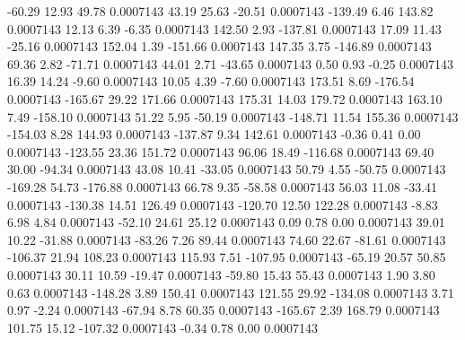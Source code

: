       -60.29       12.93       49.78     0.0007143
       43.19       25.63      -20.51     0.0007143
     -139.49        6.46      143.82     0.0007143
       12.13        6.39       -6.35     0.0007143
      142.50        2.93     -137.81     0.0007143
       17.09       11.43      -25.16     0.0007143
      152.04        1.39     -151.66     0.0007143
      147.35        3.75     -146.89     0.0007143
       69.36        2.82      -71.71     0.0007143
       44.01        2.71      -43.65     0.0007143
        0.50        0.93       -0.25     0.0007143
       16.39       14.24       -9.60     0.0007143
       10.05        4.39       -7.60     0.0007143
      173.51        8.69     -176.54     0.0007143
     -165.67       29.22      171.66     0.0007143
      175.31       14.03      179.72     0.0007143
      163.10        7.49     -158.10     0.0007143
       51.22        5.95      -50.19     0.0007143
     -148.71       11.54      155.36     0.0007143
     -154.03        8.28      144.93     0.0007143
     -137.87        9.34      142.61     0.0007143
       -0.36        0.41        0.00     0.0007143
     -123.55       23.36      151.72     0.0007143
       96.06       18.49     -116.68     0.0007143
       69.40       30.00      -94.34     0.0007143
       43.08       10.41      -33.05     0.0007143
       50.79        4.55      -50.75     0.0007143
     -169.28       54.73     -176.88     0.0007143
       66.78        9.35      -58.58     0.0007143
       56.03       11.08      -33.41     0.0007143
     -130.38       14.51      126.49     0.0007143
     -120.70       12.50      122.28     0.0007143
       -8.83        6.98        4.84     0.0007143
      -52.10       24.61       25.12     0.0007143
        0.09        0.78        0.00     0.0007143
       39.01       10.22      -31.88     0.0007143
      -83.26        7.26       89.44     0.0007143
       74.60       22.67      -81.61     0.0007143
     -106.37       21.94      108.23     0.0007143
      115.93        7.51     -107.95     0.0007143
      -65.19       20.57       50.85     0.0007143
       30.11       10.59      -19.47     0.0007143
      -59.80       15.43       55.43     0.0007143
        1.90        3.80        0.63     0.0007143
     -148.28        3.89      150.41     0.0007143
      121.55       29.92     -134.08     0.0007143
        3.71        0.97       -2.24     0.0007143
      -67.94        8.78       60.35     0.0007143
     -165.67        2.39      168.79     0.0007143
      101.75       15.12     -107.32     0.0007143
       -0.34        0.78        0.00     0.0007143
